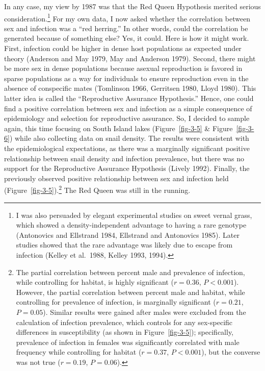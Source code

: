 \documentclass[
  letterpaper,
]{book}
\begin{document}
In any case, my view by 1987 was that the Red Queen Hypothesis merited
serious consideration.\footnote{I was also persuaded by elegant
  experimental studies on sweet vernal grass, which showed a
  density-independent advantage to having a rare genotype (Antonovics
  and Ellstrand 1984, Ellstrand and Antonovics 1985). Later studies
  showed that the rare advantage was likely due to escape from infection
  (Kelley et al.~1988, Kelley 1993, 1994).} For my own data, I now asked
whether the correlation between sex and infection was a ``red herring.''
In other words, could the correlation be generated because of something
else? Yes, it could. Here is how it might work. First, infection could
be higher in dense host populations as expected under theory (Anderson
and May 1979, May and Anderson 1979). Second, there might be more sex in
dense populations because asexual reproduction is favored in sparse
populations as a way for individuals to ensure reproduction even in the
absence of conspecific mates (Tomlinson 1966, Gerritsen 1980, Lloyd
1980). This latter idea is called the ``Reproductive Assurance
Hypothesis.'' Hence, one could find a positive correlation between sex
and infection as a simple consequence of epidemiology and selection for
reproductive assurance. So, I decided to sample again, this time
focusing on South Island lakes (Figure~\ref{fig-3-5} \&
Figure~\ref{fig-3-6}) while also collecting data on snail density. The
results were consistent with the epidemiological expectations, as there
was a marginally significant positive relationship between snail density
and infection prevalence, but there was no support for the Reproductive
Assurance Hypothesis (Lively 1992). Finally, the previously observed
positive relationship between sex and infection held
(Figure~\ref{fig-3-5}).\footnote{The partial correlation between percent
  male and prevalence of infection, while controlling for habitat, is
  highly significant (\(r = 0.36\), \(P < 0.001\)). However, the partial
  correlation between percent male and habitat, while controlling for
  prevalence of infection, is marginally significant (\(r = 0.21\),
  \(P = 0.05\)). Similar results were gained after males were excluded
  from the calculation of infection prevalence, which controls for any
  sex-specific differences in susceptibility (as shown in
  Figure~\ref{fig-3-5}); specifically, prevalence of infection in
  females was significantly correlated with male frequency while
  controlling for habitat (\(r = 0.37\), \(P < 0.001\)), but the
  converse was not true (\(r = 0.19\), \(P = 0.06\)).} The Red Queen was
still in the running.
\end{document}
